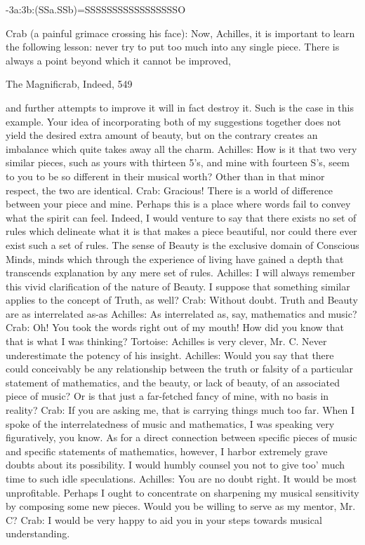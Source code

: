 {                        -3a:3b:(SSa.SSb)=SSSSSSSSSSSSSSSSSO

Crab (a painful grimace crossing his face): Now, Achilles, it is important to learn the
  following lesson: never try to put too much into any single piece. There is always a point
  beyond which it cannot be improved,




  The Magnificrab, Indeed,                                                                 549

  and further attempts to improve it will in fact destroy it. Such is the case in this example.
  Your idea of incorporating both of my suggestions together does not yield the desired
  extra amount of beauty, but on the contrary creates an imbalance which quite takes away
  all the charm.
Achilles: How is it that two very similar pieces, such as yours with thirteen 5's, and mine
  with fourteen S's, seem to you to be so different in their musical worth? Other than in that
  minor respect, the two are identical.
Crab: Gracious! There is a world of difference between your piece and mine. Perhaps this is
  a place where words fail to convey what the spirit can feel. Indeed, I would venture to say
  that there exists no set of rules which delineate what it is that makes a piece beautiful, nor
  could there ever exist such a set of rules. The sense of Beauty is the exclusive domain of
  Conscious Minds, minds which through the experience of living have gained a depth that
  transcends explanation by any mere set of rules.
Achilles: I will always remember this vivid clarification of the nature of Beauty. I suppose
  that something similar applies to the concept of Truth, as well?
Crab: Without doubt. Truth and Beauty are as interrelated as-as
Achilles: As interrelated as, say, mathematics and music?
Crab: Oh! You took the words right out of my mouth! How did you know that that is what I
  was thinking?
Tortoise: Achilles is very clever, Mr. C. Never underestimate the potency of his insight.
Achilles: Would you say that there could conceivably be any relationship between the truth
  or falsity of a particular statement of mathematics, and the beauty, or lack of beauty, of
  an associated piece of music? Or is that just a far-fetched fancy of mine, with no basis in
  reality?
Crab: If you are asking me, that is carrying things much too far. When I spoke of the
  interrelatedness of music and mathematics, I was speaking very figuratively, you know.
  As for a direct connection between specific pieces of music and specific statements of
  mathematics, however, I harbor extremely grave doubts about its possibility. I would
  humbly counsel you not to give too' much time to such idle speculations.
Achilles: You are no doubt right. It would be most unprofitable. Perhaps I ought to
  concentrate on sharpening my musical sensitivity by composing some new pieces. Would
  you be willing to serve as my mentor,
Mr. C?
Crab: I would be very happy to aid you in your steps towards musical understanding.

}
